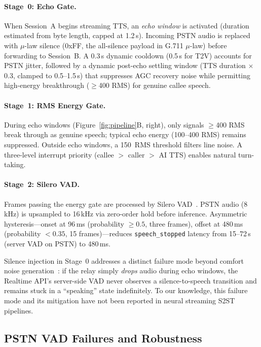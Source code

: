 \documentclass[11pt]{article}
\begin{document}
\paragraph{Stage~0: Echo Gate.}
When Session~A begins streaming TTS, an \emph{echo window} is activated (duration estimated from byte length, capped at 1.2\,s). Incoming PSTN audio is replaced with $\mu$-law silence (0xFF, the all-silence payload in G.711 $\mu$-law) before forwarding to Session~B. A 0.3\,s dynamic cooldown (0.5\,s for T2V) accounts for PSTN jitter, followed by a dynamic post-echo settling window (TTS duration $\times$ 0.3, clamped to 0.5--1.5\,s) that suppresses AGC recovery noise while permitting high-energy breakthrough ($\geq$400 RMS) for genuine callee speech.

\paragraph{Stage~1: RMS Energy Gate.}
During echo windows (Figure~\ref{fig:pipeline}B, right), only signals $\geq$400 RMS break through as genuine speech; typical echo energy (100--400 RMS) remains suppressed. Outside echo windows, a 150~RMS threshold filters line noise. A three-level interrupt priority (callee $>$ caller $>$ AI TTS) enables natural turn-taking.

\paragraph{Stage~2: Silero VAD.}
Frames passing the energy gate are processed by Silero VAD~\citep{silero_vad_2021}. PSTN audio (8\,kHz) is upsampled to 16\,kHz via zero-order hold before inference. Asymmetric hysteresis---onset at 96\,ms (probability $\geq 0.5$, three frames), offset at 480\,ms (probability $< 0.35$, 15 frames)---reduces \texttt{speech\_stopped} latency from 15--72\,s (server VAD on PSTN) to 480\,ms.

Silence injection in Stage~0 addresses a distinct failure mode beyond comfort noise generation~\citep{rfc3389_cn_2002}: if the relay simply \emph{drops} audio during echo windows, the Realtime API's server-side VAD never observes a silence-to-speech transition and remains stuck in a ``speaking'' state indefinitely. To our knowledge, this failure mode and its mitigation have not been reported in neural streaming S2ST pipelines.

\subsection{PSTN VAD Failures and Robustness}
\end{document}
